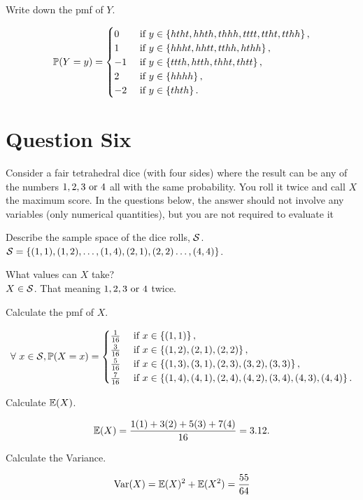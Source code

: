 \documentclass{article}
\begin{document}
            Write down the pmf of $Y$.\\

            \ans

            \[\mathbb{P}(Y = y) = \begin{cases}
                0& \text{ if } y \in \left\{ htht, hhth, thhh, tttt, ttht, tthh \right\},\\
                1&\text{ if } y\in \left\{ hhht, hhtt, tthh, hthh \right\},\\
                -1&\text{ if } y\in \left\{ ttth, htth, thht, thtt \right\},\\
                2&\text{ if } y\in \left\{ hhhh \right\},\\
                -2&\text{ if } y\in \left\{ thth \right\}.
            \end{cases}\]

    \section{Question Six}
        Consider a fair tetrahedral dice (with four sides) where the result can be any of the numbers $1, 2, 3 \text{ or } 4$ all with the same probability. You roll it twice and call $X$ the maximum score. In the questions below, the answer should not involve any variables (only numerical quantities), but you are not required to evaluate it

            Describe the sample space of the dice rolls, $\mathcal{S}$.\\

            \ans $\mathcal{S} = \left\{ (1,1), (1,2), \dots, (1,4), (2,1), (2,2)\dots, (4,4) \right\}$.
        
            What values can $X$ take?\\

            \ans $X\in\mathcal{S}$. That meaning $1,2,3\text{ or }4$ twice. 

            Calculate the pmf of $X$.\\

            \ans 

            \[\forall~ x\in \mathcal{S}, \mathbb{P}(X = x ) = \begin{cases}
                \frac{1}{16}&\text{ if } x \in \left\{ (1,1) \right\},\\
                \frac{3}{16}&\text{ if } x\in\left\{ (1,2), (2,1), (2,2) \right\},\\
                \frac{5}{16}&\text{ if } x\in\left\{ (1,3), (3,1), (2,3), (3,2), (3,3) \right\},\\
                \frac{7}{16}&\text{ if } x\in \left\{ (1,4), (4,1), (2,4), (4,2), (3,4), (4,3), (4,4) \right\}.
            \end{cases}\]

            Calculate $\mathbb{E}(X)$.\\

            \ans 

            \[\mathbb{E}(X) = \frac{1(1) + 3(2) + 5(3) + 7(4)}{16} = 3.12.\]

            Calculate the Variance.

            \ans

            \[\text{Var}(X) = \mathbb{E}(X)^2 + \mathbb{E}(X^2) = \frac{55}{64}\]
\end{document}
